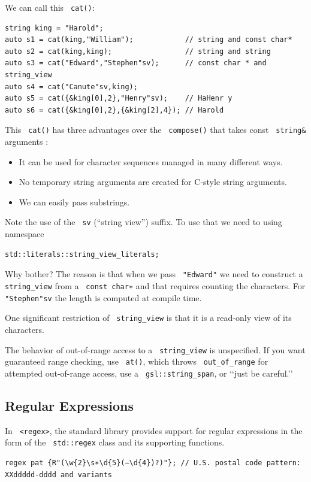 \documentclass[11pt]{article}
\let\OldTexttt\texttt
\renewcommand{\texttt}[1]{\OldTexttt{\color{MidnightBlue} #1}}
\begin{document}
We can call this \texttt{cat()}:
\begin{verbatim}
string king = "Harold";
auto s1 = cat(king,"William");            // string and const char*
auto s2 = cat(king,king);                 // string and string
auto s3 = cat("Edward","Stephen"sv);      // const char * and string_view
auto s4 = cat("Canute"sv,king);
auto s5 = cat({&king[0],2},"Henry"sv);    // HaHenr y
auto s6 = cat({&king[0],2},{&king[2],4}); // Harold
\end{verbatim}
This \texttt{cat()} has three advantages over the \texttt{compose()} that takes const \texttt{string\&} arguments :
\begin{itemize}
\item It can be used for character sequences managed in many different ways.
\item No temporary string arguments are created for C-style string arguments.
\item We can easily pass substrings.
\end{itemize}

Note the use of the \texttt{sv} (``string view'') suffix. To use that we need to using namespace
\begin{verbatim}
std::literals::string_view_literals;
\end{verbatim}
Why bother? The reason is that when we pass \texttt{"Edward"} we need to construct a \texttt{string\_view} from a
\texttt{const char∗} and that requires counting the characters. For \texttt{"Stephen"sv} the length is computed at
compile time.

One significant restriction of \texttt{string\_view} is that it is a read-only view of its characters.

The behavior of out-of-range access to a \texttt{string\_view} is unspecified. If you want guaranteed range
checking, use \texttt{at()}, which throws \texttt{out\_of\_range} for attempted out-of-range access, use a
\texttt{gsl::string\_span}, or ‘‘just be careful.’’
\subsection{Regular Expressions}
\label{sec:org509857a}
In \texttt{<regex>}, the standard library provides support for regular expressions in the form of the
\texttt{std::regex} class and its supporting functions.

\begin{verbatim}
regex pat {R"(\w{2}\s∗\d{5}(−\d{4})?)"}; // U.S. postal code pattern: XXddddd-dddd and variants
\end{verbatim}
\end{document}
